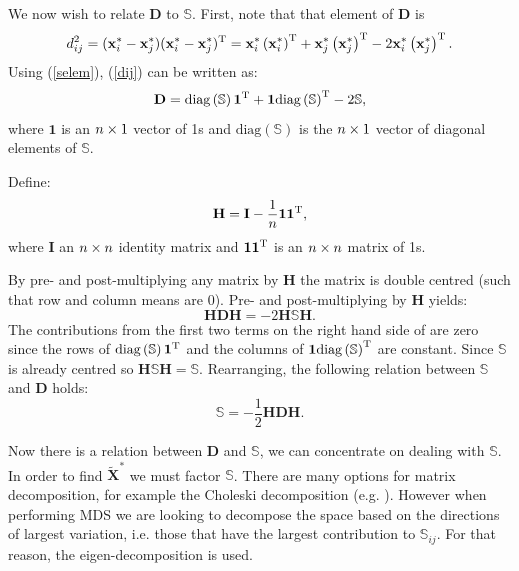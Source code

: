 We now wish to relate $\mathbf{D}$ to $\mathbb{S}$. First, note that that \ijth element of $\mathbf{D}$ is 
\begin{equation}
d_{ij}^2 = (\mathbf{x}^*_i-\mathbf{x}^*_j)(\mathbf{x}^*_i-\mathbf{x}^*_j)^{\text{T}} = \mathbf{x}^*_i \left(\mathbf{x}^*_i\right )^\text{T} + \mathbf{x}^*_j \left ( \mathbf{x}^*_j\right )^\text{T}  -2 \mathbf{x}^*_i \left (\mathbf{x}^*_j\right )^\text{T}.
\label{dij}
\end{equation}
Using (\ref{selem}),  (\ref{dij}) can be written as:
\begin{equation}
\mathbf{D}=\text{diag}\left(\mathbb{S}\right)\bm{1}^{\text{T}} + \bm{1}\text{diag}\left(\mathbb{S}\right)^{\text{T}} -2\mathbb{S},
\label{dijmat}
\end{equation}
where $\bm{1}$ is an $n \times 1$ vector of 1s and $\text{diag}\left(\mathbb{S}\right)$ is the $n \times 1$ vector of diagonal elements of $\mathbb{S}$.

Define:
\begin{equation}
\mathbf{H} = \mathbf{I}-\frac{1}{n}\bm{1}\bm{1}^{\text{T}},
\end{equation}
where $\mathbf{I}$ an $n \times n$ identity matrix and $\bm{1}\bm{1}^{\text{T}}$ is an $n \times n$ matrix of 1s.

By pre- and post-multiplying any matrix by $\mathbf{H}$ the matrix is double centred (such that row and column means are 0). Pre- and post-multiplying  by $\mathbf{H}$ yields:
\begin{equation}
\mathbf{H}\mathbf{D}\mathbf{H} = -2\mathbf{H}\mathbb{S}\mathbf{H}.
\end{equation}
The contributions from the first two terms on the right hand side of  are zero since the rows of $\text{diag}\left(\mathbb{S}\right)\bm{1}^{\text{T}}$ and the columns of  $\bm{1}\text{diag}\left(\mathbb{S}\right)^{\text{T}}$ are constant. Since $\mathbb{S}$ is already centred so $\mathbf{H}\mathbb{S}\mathbf{H}=\mathbb{S}$. Rearranging, the following relation between $\mathbb{S}$ and $\mathbf{D}$ holds:
\begin{equation}
\mathbb{S} = -\frac{1}{2}\mathbf{H}\mathbf{D}\mathbf{H}.
\end{equation}

Now there is a relation between $\mathbf{D}$ and $\mathbb{S}$, we can concentrate on dealing with $\mathbb{S}$. In order to find $\tilde{\mathbf{X}}^{*}$ we must factor $\mathbb{S}$. There are many options for matrix decomposition, for example the Choleski decomposition (e.g. \cite[pp. 334-335]{simonbook}). However when performing MDS we are looking to decompose the space based on the directions of largest variation, i.e. those that have the largest contribution to $\mathbb{S}_{ij}$. For that reason, the eigen-decomposition is used.

